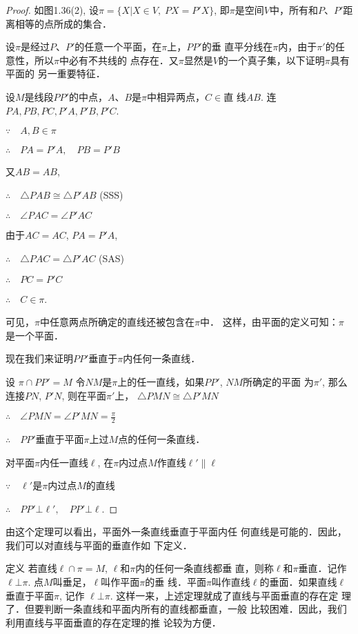 \begin{proof}
如图1.36(2), 设$\pi=\{X|X\in V,\; PX=P'X\}$, 
即$\pi$是空间$V$中，所有和$P$、$P'$距离相等的点所成的集合．

设$\pi$是经过$P$、$P'$的任意一个平面，在$\pi$上，$PP'$的垂
直平分线在$\pi$内，由于$\pi'$的任意性，所以$\pi$中必有不共线的
点存在．又$\pi$显然是$V$的一个真子集，以下证明$\pi$具有平面的
另一重要特征．

设$M$是线段$PP'$的中点，$A$、$B$是$\pi$中相异两点，$C\in$直
线$AB$. 连$PA,PB,PC,P'A,P'B,P'C$.

$\because\quad A,B\in\pi$

$\therefore\quad PA=P'A,\quad PB=P'B$

又$AB=AB$,

$\therefore\quad \triangle PAB\cong \triangle P'AB$ (SSS)

$\therefore\quad \angle PAC=\angle P'AC$

由于$AC=AC$, $PA=P'A$,

$\therefore\quad \triangle PAC=\triangle P'AC$ (SAS)

$\therefore\quad PC=P'C$

$\therefore\quad C\in\pi$.

可见，$\pi$中任意两点所确定的直线还被包含在$\pi$中．
这样，由平面的定义可知：$\pi$是一个平面．

现在我们来证明$PP'$垂直于$\pi$内任何一条直线．

设 $\pi\cap PP'=M$
令$NM$是$\pi$上的任一直线，如果$PP'$, $NM$所确定的平面
为$\pi'$, 那么连接$PN$, $P'N$, 则在平面$\pi'$上，
$\triangle PMN\cong \triangle P'MN$

$\therefore\quad \angle PMN=\angle P'MN=\frac{\pi}{2}$

$\therefore\quad PP'$垂直于平面$\pi$上过$M$点的任何一条直线．

对平面$\pi$内任一直线$\ell$, 在$\pi$内过点$M$作直线$\ell'\parallel \ell$

$\because\quad \ell'$是$\pi$内过点$M$的直线

$\therefore\quad PP'\bot \ell',\quad PP'\bot \ell$.
\end{proof}

由这个定理可以看出，平面外一条直线垂直于平面内任
何直线是可能的．因此，我们可以对直线与平面的垂直作如
下定义．

\begin{blk}
  {定义} 若直线$\ell\cap \pi=M$, $\ell$和$\pi$内的任何一条直线都垂
直，则称$\ell$和$\pi$垂直．记作$\ell\bot \pi$. 点$M$叫垂足，$\ell$叫作平面$\pi$的垂
线．平面$\pi$叫作直线$\ell$的垂面．如果直线$\ell$垂直于平面$\pi$, 记作
$\ell\bot \pi$. 这样一来，上述定理就成了直线与平面垂直的存在定
理了．但要判断一条直线和平面内所有的直线都垂直，一般
比较困难．因此，我们利用直线与平面垂直的存在定理的推
论较为方便．
\end{blk}

